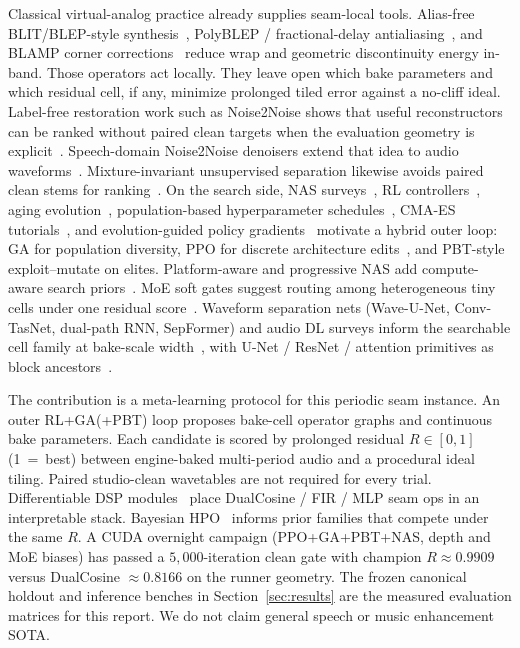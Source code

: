 Classical virtual-analog practice already supplies seam-local tools.
Alias-free BLIT/BLEP-style synthesis~\cite{stilson1996}, PolyBLEP / fractional-delay antialiasing~\cite{nam2009polyblep}, and BLAMP corner corrections~\cite{esqueda2016blamp} reduce wrap and geometric discontinuity energy in-band.
Those operators act locally.
They leave open which bake parameters and which residual cell, if any, minimize prolonged tiled error against a no-cliff ideal.
Label-free restoration work such as Noise2Noise shows that useful reconstructors can be ranked without paired clean targets when the evaluation geometry is explicit~\cite{lehtinen2018}.
Speech-domain Noise2Noise denoisers extend that idea to audio waveforms~\cite{kashyap2021n2n}.
Mixture-invariant unsupervised separation likewise avoids paired clean stems for ranking~\cite{wisdom2020}.
On the search side, NAS surveys~\cite{elsken2019}, RL controllers~\cite{zoph2017nas,pham2018}, aging evolution~\cite{real2017large,real2019}, population-based hyperparameter schedules~\cite{jaderberg2017}, CMA-ES tutorials~\cite{hansen2016cmaes}, and evolution-guided policy gradients~\cite{khadka2018} motivate a hybrid outer loop: GA for population diversity, PPO for discrete architecture edits~\cite{schulman2017}, and PBT-style exploit--mutate on elites.
Platform-aware and progressive NAS add compute-aware search priors~\cite{tan2019mnasnet,liu2018pnas}.
MoE soft gates suggest routing among heterogeneous tiny cells under one residual score~\cite{shazeer2017}.
Waveform separation nets (Wave-U-Net, Conv-TasNet, dual-path RNN, SepFormer) and audio DL surveys inform the searchable cell family at bake-scale width~\cite{stoller2018,macartney2018,luo2019,luo2020dprnn,subakan2021,purwins2019,gong2021ast}, with U-Net / ResNet / attention primitives as block ancestors~\cite{ronneberger2015,he2016resnet,vaswani2017,jansson2017}.

The contribution is a meta-learning protocol for this periodic seam instance.
An outer RL+GA(+PBT) loop proposes bake-cell operator graphs and continuous bake parameters.
Each candidate is scored by prolonged residual $R\in[0,1]$ (1~=~best) between engine-baked multi-period audio and a procedural ideal tiling.
Paired studio-clean wavetables are not required for every trial.
Differentiable DSP modules~\cite{engel2020} place DualCosine / FIR / MLP seam ops in an interpretable stack.
Bayesian HPO~\cite{snoek2012} informs prior families that compete under the same $R$.
A CUDA overnight campaign (PPO+GA+PBT+NAS, depth and MoE biases) has passed a $5{,}000$-iteration clean gate with champion $R\approx 0.9909$ versus DualCosine $\approx 0.8166$ on the runner geometry.
The frozen canonical holdout and inference benches in Section~\ref{sec:results} are the measured evaluation matrices for this report.
We do not claim general speech or music enhancement SOTA.

